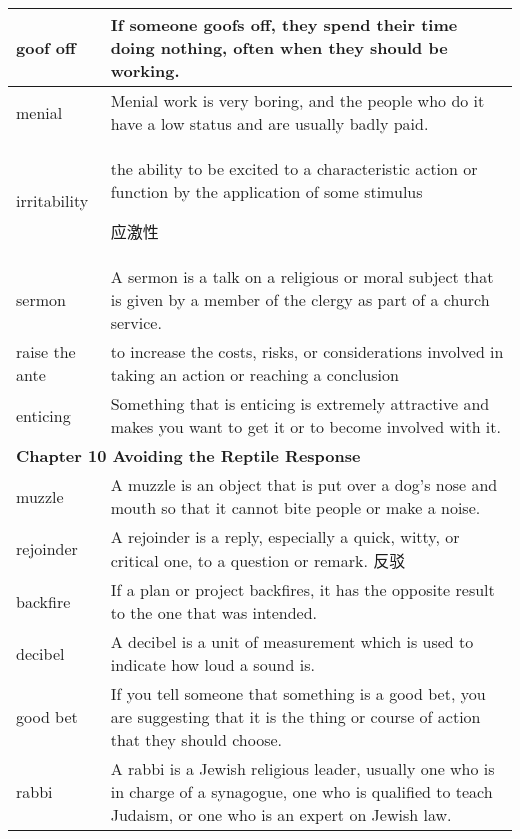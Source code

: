 \documentclass{article}
\begin{document}
\begin{center}
\begin{longtable}{|l|p{9cm}|}
\hline
goof off
&
If someone goofs off, they spend their time doing nothing, often when they should be working.
\\

\hline
menial
&
Menial work is very boring, and the people who do it have a low status and are usually badly paid.
\\

\hline
irritability
&
the ability to be excited to a characteristic action or function by the application of some stimulus
\par
应激性
\\

\hline
sermon
&
A sermon is a talk on a religious or moral subject that is given by a member of the clergy as part of a church service.
\\


\hline
raise the ante
&
to increase the costs, risks, or considerations involved in taking an action or reaching a conclusion
\\

\hline
enticing
&
Something that is enticing is extremely attractive and makes you want to get it or to become involved with it.
\\

\hline
\multicolumn{2}{|l|}{\textbf{Chapter 10 Avoiding the Reptile Response}}\\

\hline
muzzle
&
A muzzle is an object that is put over a dog's nose and mouth so that it cannot bite people or make a noise.
\\

\hline
rejoinder
&
A rejoinder is a reply, especially a quick, witty, or critical one, to a question or remark. 反驳
\\

\hline
backfire
&
If a plan or project backfires, it has the opposite result to the one that was intended.
\\

\hline
decibel
&
A decibel is a unit of measurement which is used to indicate how loud a sound is.
\\

\hline
good bet
&
If you tell someone that something is a good bet, you are suggesting that it is the thing or course of action that they should choose.
\\

\hline
rabbi
&
A rabbi is a Jewish religious leader, usually one who is in charge of a synagogue, one who is qualified to teach Judaism, or one who is an expert on Jewish law.
\\


\end{longtable}
\end{center}
\end{document}
